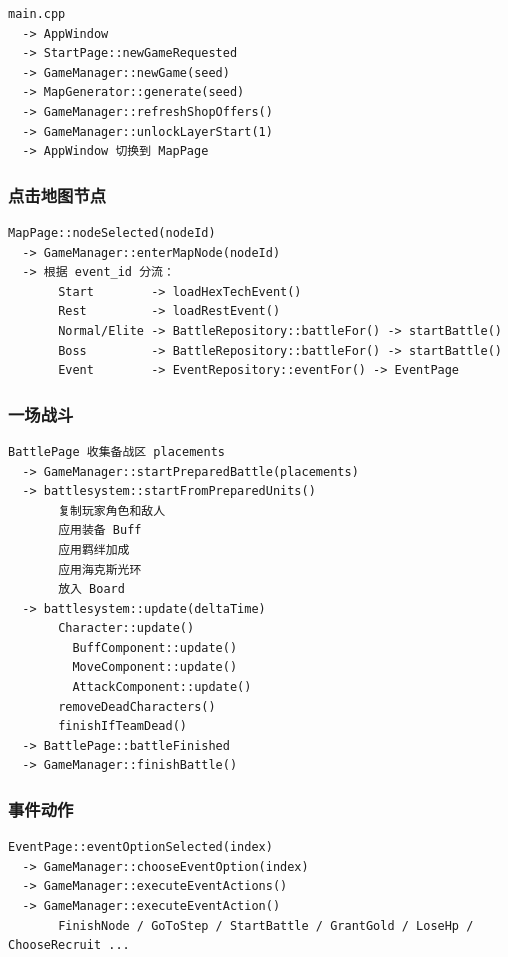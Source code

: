 \documentclass[UTF8,10pt]{ctexart}
\begin{document}
\begin{lstlisting}
main.cpp
  -> AppWindow
  -> StartPage::newGameRequested
  -> GameManager::newGame(seed)
  -> MapGenerator::generate(seed)
  -> GameManager::refreshShopOffers()
  -> GameManager::unlockLayerStart(1)
  -> AppWindow 切换到 MapPage
\end{lstlisting}

\subsubsection*{点击地图节点}

\begin{lstlisting}
MapPage::nodeSelected(nodeId)
  -> GameManager::enterMapNode(nodeId)
  -> 根据 event_id 分流：
       Start        -> loadHexTechEvent()
       Rest         -> loadRestEvent()
       Normal/Elite -> BattleRepository::battleFor() -> startBattle()
       Boss         -> BattleRepository::battleFor() -> startBattle()
       Event        -> EventRepository::eventFor() -> EventPage
\end{lstlisting}

\subsubsection*{一场战斗}

\begin{lstlisting}
BattlePage 收集备战区 placements
  -> GameManager::startPreparedBattle(placements)
  -> battlesystem::startFromPreparedUnits()
       复制玩家角色和敌人
       应用装备 Buff
       应用羁绊加成
       应用海克斯光环
       放入 Board
  -> battlesystem::update(deltaTime)
       Character::update()
         BuffComponent::update()
         MoveComponent::update()
         AttackComponent::update()
       removeDeadCharacters()
       finishIfTeamDead()
  -> BattlePage::battleFinished
  -> GameManager::finishBattle()
\end{lstlisting}

\subsubsection*{事件动作}

\begin{lstlisting}
EventPage::eventOptionSelected(index)
  -> GameManager::chooseEventOption(index)
  -> GameManager::executeEventActions()
  -> GameManager::executeEventAction()
       FinishNode / GoToStep / StartBattle / GrantGold / LoseHp / ChooseRecruit ...
\end{lstlisting}
\end{document}
